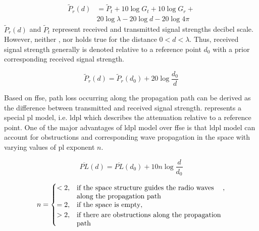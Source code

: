     \begin{equation}
      \begin{split}
        \label{eq:friisdBm}
        \widetilde{P}_r(d) &= \widetilde{P}_t + 10 \log{G_t} + 10 \log{G_r} + \\
        & 20 \log{\lambda} - 20 \log{d} - 20 \log{4 \pi}
      \end{split}
    \end{equation}
    $\widetilde{P}_r(d)$ and $\widetilde{P}_t$ represent received and transmitted signal strengths decibel scale.
    However, neither , nor  holds true for the distance $0<d<\lambda$.
    Thus, received signal strength generally is denoted relative to a reference point $d_0$ with a prior corresponding received signal strength.

    \begin{equation}
        \label{eq:friisRef}
        \widetilde{P}_r(d) = \widetilde{P}_r(d_0) + 20 \log{\dfrac{d_0}{d}}
    \end{equation}


    Based on \gls{ffse}, path loss occurring along the propagation path can be derived as the difference between transmitted and received signal strength.
     represents a special \gls{pl} model, i.e. \gls{ldpl} which describes the attenuation relative to a reference point.
    One of the major advantages of \gls{ldpl} model over \gls{ffse} is that \gls{ldpl} model can account for obstructions and corresponding wave propagation in the space with varying values of \gls{pl} exponent $n$.


    \begin{equation}
        \label{eq:log-distance}
        \overline{PL}(d) = \overline{PL}(d_0) + 10 n \log{\dfrac{d}{d_0}}
    \end{equation}

    \begin{equation}
        n =
        \begin{cases}
            <2,& \parbox[t]{.6\textwidth}{if the space structure guides the radio waves\\
                                        along the propagation path}, \\
            =2,& \text{if the space is empty}, \\
            >2,& \parbox[t]{.6\textwidth}{if there are obstructions along the propagation\\
                                        path}
        \end{cases}
    \end{equation}

